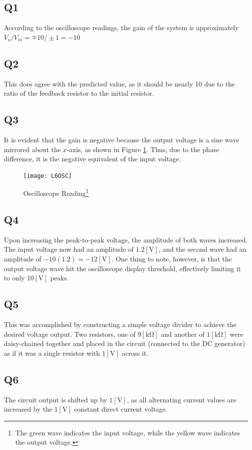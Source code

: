 \documentclass[
	letterpaper, %
	10pt, %
]{CSUniSchoolLabReport}
\begin{document}
\subsection{Q1} According to the oscilloscope readings, the gain of the system is approximately $V_o/V_{in}=\mp10/\pm1=-10$

\subsection{Q2} This does agree with the predicted value, as it should be nearly 10 due to the ratio of the feedback resistor to the initial resistor.

\subsection{Q3} It is evident that the gain is negative because the output voltage is a sine wave mirrored about the $x$-axis, as shown in Figure \ref{fig:2}. Thus, due to the phase difference, it is the negative equivalent of the input voltage.

\begin{figure}[H]
  \centering
  \texttt{[image: L6OSC]}
  \caption{Oscilloscope Reading\footnote{The green wave indicates the input voltage, while the yellow wave indicates the output voltage.}}
  \label{fig:2}
\end{figure}

\subsection{Q4} Upon increasing the peak-to-peak voltage, the amplitude of both waves increased. The input voltage now had an amplitude of $1.2[\si{\volt}]$, and the second wave had an amplitude of $-10(1.2)=-12[\si{\volt}]$. One thing to note, however, is that the output voltage wave hit the oscilloscope display threshold, effectively limiting it to only $10[\si{\volt}]$ peaks.

\subsection{Q5} This was accomplished by constructing a simple voltage divider to achieve the desired voltage output. Two resistors, one of $9[\si{\kilo\ohm}]$ and another of $1[\si{\kilo\ohm}]$ were daisy-chained together and placed in the circuit (connected to the DC generator) as if it was a single resistor with $1[\si{\volt}]$ across it. 

\subsection{Q6} The circuit output is shifted up by $1[\si{\volt}]$, as all alternating current values are increased by the $1[\si{\volt}]$ constant direct current voltage.
\end{document}
